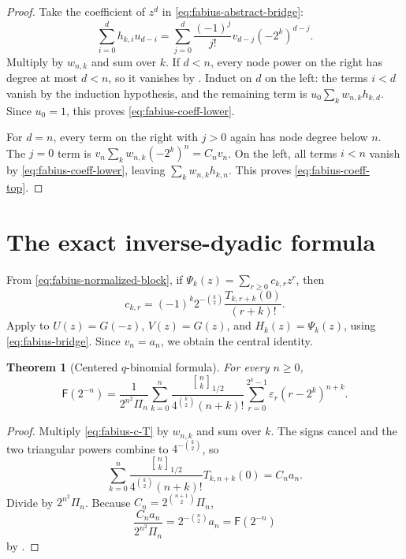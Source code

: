 \documentclass[11pt,oneside,openany]{book}
\newtheorem{theorem}{Theorem}[chapter]
\theoremstyle{definition}
\theoremstyle{remark}
\newcommand{\Qbinom}[3]{\genfrac{[}{]}{0pt}{}{#1}{#2}_{#3}}
\newcommand{\eps}{\varepsilon}
\newcommand{\Fab}{\mathsf F}
\begin{document}
\begin{proof}
Take the coefficient of $z^d$ in
\eqref{eq:fabius-abstract-bridge}:
\begin{equation}\label{eq:fabius-coeff-convolution}
 \sum_{i=0}^dh_{k,i}u_{d-i}
 =\sum_{j=0}^d\frac{(-1)^j}{j!}v_{d-j}(-2^k)^{d-j}.
\end{equation}
Multiply by $w_{n,k}$ and sum over $k$.  If $d<n$, every node power on the
right has degree at most $d<n$, so it vanishes by
.  Induct on $d$ on the left: the terms
$i<d$ vanish by the induction hypothesis, and the remaining term is
$u_0\sum_kw_{n,k}h_{k,d}$.  Since $u_0=1$, this proves
\eqref{eq:fabius-coeff-lower}.

For $d=n$, every term on the right with $j>0$ again has node degree below
$n$.  The $j=0$ term is
$v_n\sum_kw_{n,k}(-2^k)^n=C_nv_n$.  On the left, all terms $i<n$ vanish by
\eqref{eq:fabius-coeff-lower}, leaving
$\sum_kw_{n,k}h_{k,n}$.  This proves \eqref{eq:fabius-coeff-top}.
\end{proof}

\section{The exact inverse-dyadic formula}

From \eqref{eq:fabius-normalized-block}, if
$\Psi_k(z)=\sum_{r\ge0}c_{k,r}z^r$, then
\begin{equation}\label{eq:fabius-c-T}
 c_{k,r}=(-1)^k2^{-\binom k2}
          \frac{T_{k,r+k}(0)}{(r+k)!}.
\end{equation}
Apply  to
$U(z)=G(-z)$, $V(z)=G(z)$, and $H_k(z)=\Psi_k(z)$, using
\eqref{eq:fabius-bridge}.  Since $v_n=a_n$, we obtain the central identity.

\begin{theorem}[Centered $q$-binomial formula]\label{thm:fabius-centered-q-formula}
For every $n\ge0$,
\begin{equation}\label{eq:fabius-centered-q-formula}
\boxed{
 \Fab(2^{-n})=
 \frac1{2^{n^2}\Pi_n}
 \sum_{k=0}^n
 \frac{\Qbinom nk{1/2}}{4^{\binom k2}(n+k)!}
 \sum_{r=0}^{2^k-1}\eps_r(r-2^k)^{n+k}.}
\end{equation}
\end{theorem}

\begin{proof}
Multiply \eqref{eq:fabius-c-T} by $w_{n,k}$ and sum over $k$.  The signs
cancel and the two triangular powers combine to $4^{-\binom k2}$, so
\[
 \sum_{k=0}^n
 \frac{\Qbinom nk{1/2}}{4^{\binom k2}(n+k)!}
 T_{k,n+k}(0)=C_na_n.
\]
Divide by $2^{n^2}\Pi_n$.  Because
$C_n=2^{\binom{n+1}{2}}\Pi_n$,
\[
 \frac{C_na_n}{2^{n^2}\Pi_n}
 =2^{-\binom n2}a_n=\Fab(2^{-n})
\]
by .
\end{proof}
\end{document}
